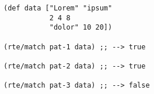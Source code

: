 \begin{lstlisting}[style=reclojureClojure]
(def data ["Lorem" "ipsum"
           2 4 8
           "dolor" 10 20])

(rte/match pat-1 data) ;; --> true

(rte/match pat-2 data) ;; --> true

(rte/match pat-3 data) ;; --> false
\end{lstlisting}
